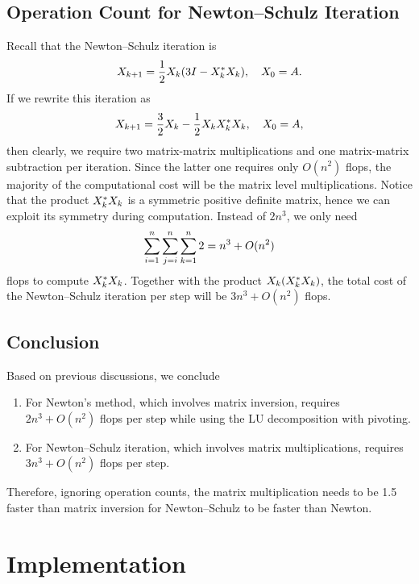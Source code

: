 \documentclass[12pt]{article}
\begin{document}
\subsection{Operation Count for Newton--Schulz Iteration}
Recall that the Newton--Schulz iteration is 
\begin{equation}\notag
    X_{k+1} = \frac 12 X_k(3I-X_k^* X_k),\quad X_0 = A.
\end{equation}
If we rewrite this iteration as
\begin{equation}
    \notag
    X_{k+1} = \frac{3}{2} X_k - \frac{1}{2}X_kX_k^* X_k,\quad X_0 = A,
\end{equation}
then clearly, we require two matrix-matrix multiplications and one matrix-matrix subtraction per iteration. Since the latter one requires only $O(n^2)$ flops, the majority of the computational cost will be the matrix level multiplications. Notice that the product $X_k^* X_k$ is a symmetric positive definite matrix, hence we can exploit its symmetry during computation. Instead of $2n^3$, we only need 
\begin{equation}
    \notag 
    \sum_{i=1}^n\sum_{j=i}^n\sum_{k=1}^n 2 = n^3 + O(n^2)
\end{equation}
flops to compute $X_k^* X_k$. Together with the product $X_k(X_k^* X_k)$, the total cost of the Newton--Schulz iteration per step will be $3n^3 + O(n^2)$ flops.

\subsection{Conclusion}
Based on previous discussions, we conclude 
\begin{enumerate}
    \item For Newton's method, which involves matrix inversion, requires $2n^3 + O(n^2)$ flops per step while using the LU decomposition with pivoting.
    \item For Newton--Schulz iteration, which involves matrix multiplications, requires $3n^3 + O(n^2)$ flops per step.
\end{enumerate}

Therefore, ignoring operation counts, the matrix multiplication needs to be 1.5 faster than matrix inversion for Newton--Schulz to be faster than Newton.

\section{Implementation}
\end{document}
